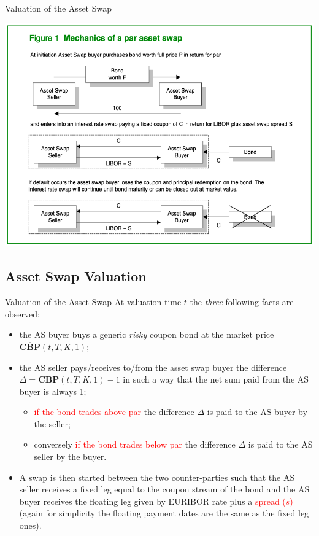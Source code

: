 \documentclass{beamer}
\begin{document}
\begin{frame}{Valuation of the Asset Swap}
	\begin{center}
		\includegraphics[width=0.7\linewidth]{images/asset_swap}
	\end{center}
\end{frame}

\subsection{Asset Swap Valuation}
\begin{frame}{Valuation of the Asset Swap}
	At valuation time $t$ the \emph{three} following facts are observed:
	\begin{itemize}
		\item<2-> the AS buyer buys a generic \emph{risky} coupon bond at the market price $\overline{\textbf{CBP}}(t,T,K,1)$;
		\item<3-> the AS seller pays/receives to/from the asset swap buyer the difference $\Delta = \overline{\textbf{CBP}}(t,T,K,1)-1$ in such a way that the net sum paid from the AS buyer is always 1; 
		\begin{itemize}
			\item \textcolor{red}{if the bond trades above par} the difference $\Delta$ is paid to the AS buyer by the seller;
			\item conversely \textcolor{red}{if the bond trades below par} the difference $\Delta$ is paid to the AS seller by the buyer.
		\end{itemize}
		\item<4-> A swap is then started between the two counter-parties such that the AS seller receives a fixed leg equal to the coupon stream of the bond and the AS buyer receives the floating leg given by EURIBOR rate plus a \textcolor{red}{spread ($s$)} (again for simplicity the floating payment dates are the same as the fixed leg ones).
	\end{itemize}
\end{frame}
\end{document}
